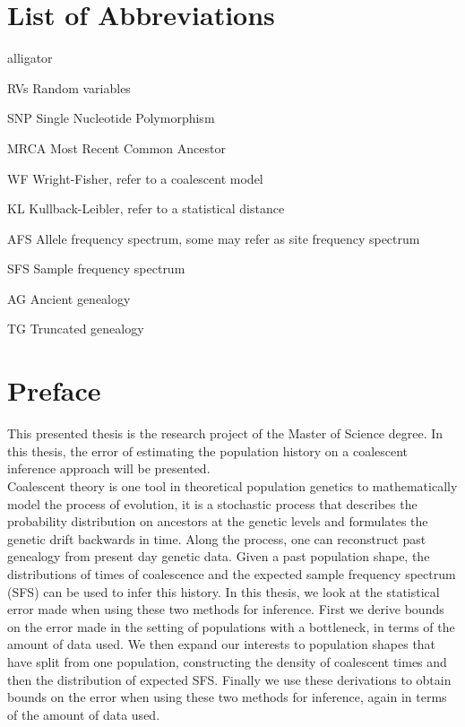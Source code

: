 \documentclass[12pt, a4paper,twoside]{report}
\theoremstyle{definition}
\theoremstyle{myplain}
\theoremstyle{mypro}
\begin{document}
\chapter*{List of Abbreviations}
\begin{labeling}{alligator}
\item [RVs] Random variables
\item [SNP] Single Nucleotide Polymorphism
\item [MRCA] Most Recent Common Ancestor
\item [WF] Wright-Fisher, refer to a coalescent model
\item [KL] Kullback-Leibler, refer to a statistical distance
\item [AFS] Allele frequency spectrum, some may refer as site frequency spectrum
\item [SFS] Sample frequency spectrum
\item [AG] Ancient genealogy
\item [TG] Truncated genealogy
\end{labeling}

\clearpage

\chapter*{Preface} %
This presented thesis is the research project of the Master of Science degree. In this thesis, the error of estimating the population history on a coalescent inference approach will be presented.\\

Coalescent theory is one tool in theoretical population genetics to mathematically model the process of evolution, it is a stochastic process that describes the probability distribution on ancestors at the genetic levels and formulates the genetic drift backwards in time. Along the process, one can reconstruct past genealogy from present day genetic data. Given a past population shape, the distributions of times of coalescence and the expected sample frequency spectrum (SFS) can be used to infer this history. In this thesis, we look at the statistical error made when using these two methods for inference. First we derive bounds on the error made in the setting of populations with a bottleneck, in terms of the amount of data used. We then expand our interests to population shapes that have split from one population, constructing the density of coalescent times and then the distribution of expected SFS. Finally we use these derivations to obtain bounds on the error when using these two methods for inference, again in terms of the amount of data used.\\
\end{document}
